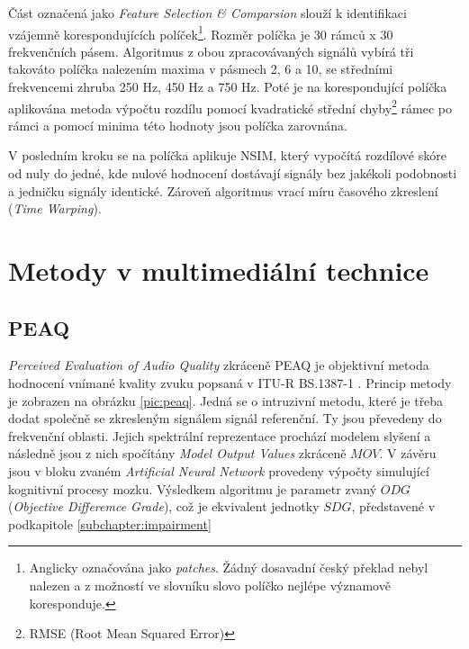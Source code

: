 Část označená jako \textit{Feature Selection \& Comparsion} slouží k identifikaci vzájemně korespondujících políček\footnote{Anglicky označována jako \textit{patches}. Žádný dosavadní český překlad nebyl nalezen a z možností ve slovníku slovo políčko nejlépe významově koresponduje.}. Rozměr políčka je 30 rámců x 30 frekvenčních pásem. Algoritmus z obou zpracovávaných signálů vybírá tři takováto políčka nalezením maxima v pásmech 2, 6 a 10, se středními frekvencemi zhruba 250 Hz, 450 Hz a 750 Hz.
Poté je na korespondující políčka aplikována metoda výpočtu rozdílu pomocí kvadratické střední chyby\footnote{RMSE (Root Mean Squared Error)} rámec po rámci a pomocí minima této hodnoty jsou políčka zarovnána.

V posledním kroku se na políčka aplikuje NSIM, který vypočítá rozdílové skóre od nuly do jedné, kde nulové hodnocení dostávají signály bez jakékoli podobnosti a jedničku signály identické. Zároveň algoritmus vrací míru časového zkreslení (\textit{Time Warping}).

\section{Metody v multimediální technice}
\subsection{PEAQ}

\textit{Perceived Evaluation of Audio Quality} zkráceně PEAQ je objektivní metoda hodnocení vnímané kvality zvuku popsaná v ITU-R BS.1387-1 \cite{itur:1387}. Princip metody je zobrazen na obrázku \ref{pic:peaq}. Jedná se o intruzivní metodu, které je třeba dodat společně se zkresleným signálem signál referenční. Ty jsou převedeny do frekvenční oblasti. Jejich spektrální reprezentace prochází modelem slyšení a následně jsou z nich spočítány \textit{Model Output Values} zkráceně $MOV$. V závěru jsou v bloku zvaném \textit{Artificial Neural Network} provedeny výpočty simulující kognitivní procesy mozku. Výsledkem algoritmu je parametr zvaný $ODG$ (\textit{Objective Differemce Grade}), což je ekvivalent jednotky $SDG$, představené v podkapitole \ref{subchapter:impairment}


